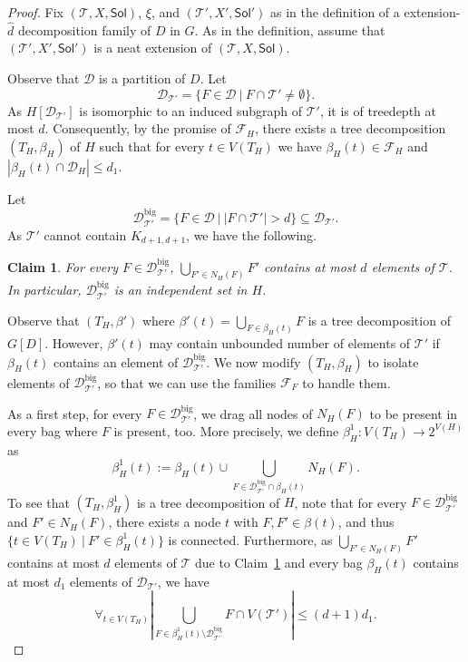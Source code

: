 \documentclass[10pt,a4paper]{amsart}
\newtheorem{claim}{Claim}
\def\Sol{\mathsf{Sol}}
\def\T{\mathcal{T}}
\begin{document}
\begin{proof}
Fix $(\T,X,\Sol)$, $\xi$, and $(\T',X',\Sol')$ as in the definition of
a extension-$\widehat{d}$ decomposition family of $D$ in $G$.
As in the definition, assume that $(\T',X',\Sol')$ is a neat extension
of $(\T,X,\Sol)$. 

Observe that $\mathcal{D}$ is a partition of $D$.  
Let 
\[\mathcal{D}_{\T'} = \{F \in \mathcal{D}~|~ F \cap \T' \neq \emptyset\} .\]
As $H[\mathcal{D}_{\T'}]$ is isomorphic to an induced subgraph of $\T'$, it is of treedepth at most $d$. 
Consequently, by the promise of $\mathcal{F}_H$, there exists a tree decomposition $(T_H,\beta_H)$ of $H$
such that for every $t \in V(T_H)$ we have $\beta_H(t) \in \mathcal{F}_H$ and $|\beta_H(t) \cap \mathcal{D}_H| \leq d_1$. 

Let 
\[ \mathcal{D}^\mathrm{big}_{\T'} = \{F \in \mathcal{D}~|~|F \cap \T'| > d\} \subseteq \mathcal{D}_{\T'}. \]
As $\T'$ cannot contain $K_{d+1,d+1}$, we have the following.
\begin{claim}\label{cl:handle-bip:big}
For every $F \in \mathcal{D}^\mathrm{big}_{\T'}$, $\bigcup_{F' \in N_H(F)} F'$ contains at most $d$ elements of $\T$.
In particular, $\mathcal{D}^\mathrm{big}_{\T'}$ is an independent set in $H$.
\end{claim}

Observe that $(T_H,\beta')$ where $\beta'(t) = \bigcup_{F \in \beta_H(t)} F$ is a tree decomposition of $G[D]$.
However, $\beta'(t)$ may contain unbounded number of elements of $\T'$ if $\beta_H(t)$ contains an element of $\mathcal{D}^\mathrm{big}_{\T'}$.
We now modify $(T_H,\beta_H)$ to isolate elements of $\mathcal{D}^\mathrm{big}_{\T'}$, so that we can use the families $\mathcal{F}_{F}$ to handle them. 

As a first step, for every $F \in \mathcal{D}^\mathrm{big}_{\T'}$,
we drag all nodes of $N_H(F)$ to be present in every bag where $F$ is present, too.
More precisely, we define $\beta_H^1 : V(T_H) \to 2^{V(H)}$ as
\[ \beta_H^1(t) := \beta_H(t) \cup \bigcup_{F \in \mathcal{D}^\mathrm{big}_{\T'} \cap \beta_H(t)} N_H(F). \]
To see that $(T_H,\beta_H^1)$ is a tree decomposition of $H$, note that for every $F \in \mathcal{D}^\mathrm{big}_{\T'}$ and
  $F' \in N_H(F)$, there exists a node $t$ with $F,F' \in \beta(t)$, and thus $\{t\in V(T_H)~|~F' \in \beta_H^1(t)\}$ is connected.
Furthermore, as $\bigcup_{F' \in N_H(F)} F'$ contains at most $d$ elements of $\T$ due to Claim~\ref{cl:handle-bip:big}
and every bag $\beta_H(t)$ contains at most $d_1$ elements of $\mathcal{D}_{\T'}$, we have
  \[ \forall_{t \in V(T_H)} \left|\bigcup_{F \in \beta_H^1(t) \setminus \mathcal{D}^\mathrm{big}_{\T'}} F \cap V(\T')\right| \leq  (d+1)d_1. \]


\end{proof}
\end{document}
